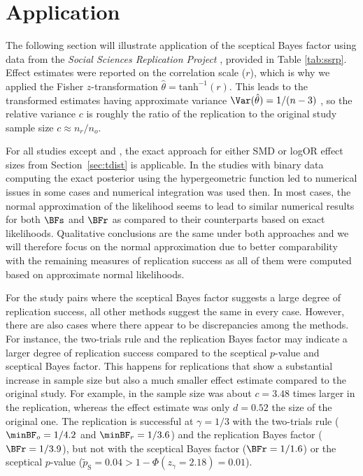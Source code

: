 \section{Application}
\label{sec:applications}
The following section will illustrate application of the sceptical Bayes factor
using data from the \emph{Social Sciences Replication Project}
\citep{Camerer2018}, provided in Table \ref{tab:ssrp}. Effect estimates were
reported on the correlation scale ($r$), which is why we applied the Fisher
$z$-transformation $\hat{\theta} = \text{tanh}^{-1}(r)$. This leads to the
transformed estimates having approximate variance
$\Var(\hat{\theta}) = 1/(n - 3)$ \citep{Fisher1921}, so the relative variance
$c$ is roughly the ratio of the replication to the original study sample size
$c \approx n_{r}/n_{o}$.

For all studies except \citet{Janssen2010} and \citet{Derex2013}, the exact
approach for either SMD or logOR effect sizes from Section~\ref{sec:tdist} is
applicable. In the studies with binary data
computing the exact posterior using the hypergeometric function led to numerical
issues in some cases and numerical integration was used then.
In most cases, the normal approximation of the likelihood seems to lead to
similar numerical results for both $\BFs$ and $\BFr$ as compared to their
counterparts based on exact likelihoods. Qualitative conclusions are the same
under both approaches and we will therefore focus on the normal approximation
due to better comparability with the remaining measures of replication success
as all of them were computed based on approximate normal likelihoods.


For the study pairs where the sceptical Bayes factor suggests a large degree of
replication success, all other methods suggest the same in every case. However,
there are also cases where there appear to be discrepancies among the methods.
For instance, the two-trials rule and the replication Bayes factor may indicate
a larger degree of replication success compared to the sceptical $p$-value and
sceptical Bayes factor. This happens for replications that show a substantial
increase in sample size but also a much smaller effect estimate compared to the
original study. For example, in \citet{Balafoutas2012} the sample size was about
$c = 3.48$ times larger in the replication, whereas the effect estimate was only
$d = 0.52$ the size of the original one. The replication is successful at
$\gamma = 1/3$ with the two-trials rule ($\minBF_{o} = 1/4.2$ and
$\minBF_{r} = 1/3.6$) and the replication Bayes factor ($\BFr = 1/3.9$), but not
with the sceptical Bayes factor ($\BFr = 1/1.6$) or the sceptical $p$-value
($\tilde{p}_{\mathrm{S}} = 0.04 > 1 - \Phi(z_\gamma = 2.18) = 0.01$).


